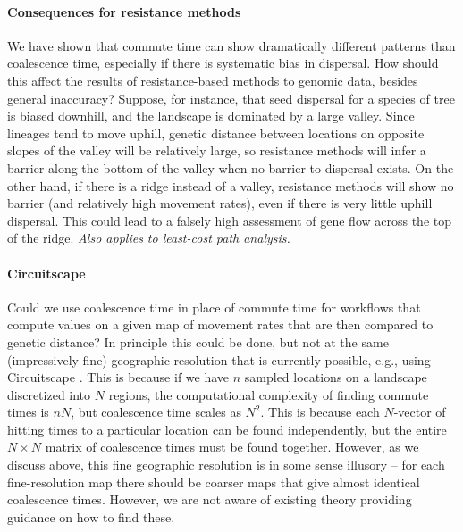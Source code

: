 \documentclass{article}
\newcommand{\plr}[1]{{\em \color{blue} #1}}
\begin{document}
\paragraph{Consequences for resistance methods}
We have shown that commute time can show dramatically different patterns
than coalescence time, especially if there is systematic bias in dispersal.
How should this affect the results of resistance-based methods to genomic data,
besides general inaccuracy?
Suppose, for instance, that seed dispersal for a species of tree
is biased downhill,
and the landscape is dominated by a large valley.
Since lineages tend to move uphill,
genetic distance between locations on opposite slopes of the valley will be relatively large,
so resistance methods will infer a barrier along the bottom of the valley
when no barrier to dispersal exists.
On the other hand, if there is a ridge instead of a valley,
resistance methods will show no barrier (and relatively high movement rates),
even if there is very little uphill dispersal.
This could lead to a falsely high assessment of gene flow across the top of the ridge.
\plr{Also applies to least-cost path analysis.}

\paragraph{Circuitscape}
Could we use coalescence time in place of commute time
for workflows that compute values on a given map of movement rates
that are then compared to genetic distance?
In principle this could be done,
but not at the same (impressively fine) geographic resolution that is currently possible,
e.g., using Circuitscape \citep{circuitscape}.
This is because if we have $n$ sampled locations
on a landscape discretized into $N$ regions,
the computational complexity of finding commute times is $nN$,
but coalescence time scales as $N^2$.
This is because each $N$-vector of hitting times to a particular location can be found independently,
but the entire $N \times N$ matrix of coalescence times must be found together.
However, as we discuss above, this fine geographic resolution is in some sense illusory --
for each fine-resolution map there should be coarser maps that give almost identical coalescence times.
However, we are not aware of existing theory providing guidance on how to find these.
\end{document}
